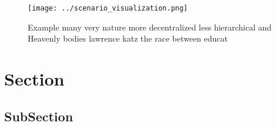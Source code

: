 \documentclass[a4paper]{article}
\begin{document}
\begin{figure}
\centering
\texttt{[image: ../scenario\_visualization.png]}
\caption{Example many very nature more decentralized less hierarchical and Heavenly bodies lawrence katz the race between educat
}
\end{figure}
 
\section{Section}

\subsection{SubSection}
\end{document}
